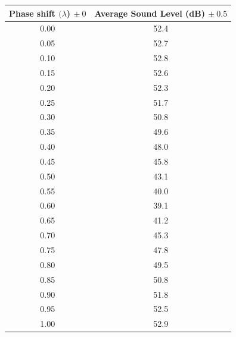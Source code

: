 \documentclass[index]{subfiles}
\begin{document}
\begin{table}[H]
    \centering
    \begin{tabular}{@{}cc@{}} \toprule
        Phase shift \((\lambda\)) \(\pm\ 0\) & Average Sound Level (dB) \(\pm\ 0.5\) \\ \midrule
        0.00                                 & 52.4                                  \\
        0.05                                 & 52.7                                  \\
        0.10                                 & 52.8                                  \\
        0.15                                 & 52.6                                  \\
        0.20                                 & 52.3                                  \\
        0.25                                 & 51.7                                  \\
        0.30                                 & 50.8                                  \\
        0.35                                 & 49.6                                  \\
        0.40                                 & 48.0                                  \\
        0.45                                 & 45.8                                  \\
        0.50                                 & 43.1                                  \\
        0.55                                 & 40.0                                  \\
        0.60                                 & 39.1                                  \\
        0.65                                 & 41.2                                  \\
        0.70                                 & 45.3                                  \\
        0.75                                 & 47.8                                  \\
        0.80                                 & 49.5                                  \\
        0.85                                 & 50.8                                  \\
        0.90                                 & 51.8                                  \\
        0.95                                 & 52.5                                  \\
        1.00                                 & 52.9                                  \\
    \end{tabular}
\end{table}
\end{document}
